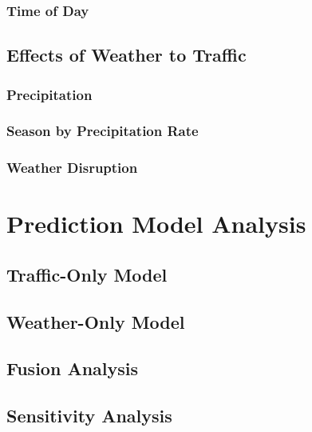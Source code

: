 \subsubsection{Time of Day}


\subsection{Effects of Weather to Traffic}
\subsubsection{Precipitation}
\subsubsection{Season by Precipitation Rate}
\subsubsection{Weather Disruption}



\section{Prediction Model Analysis}

\subsection{Traffic-Only Model}
\subsection{Weather-Only Model}
\subsection{Fusion Analysis}
\subsection{Sensitivity Analysis}
